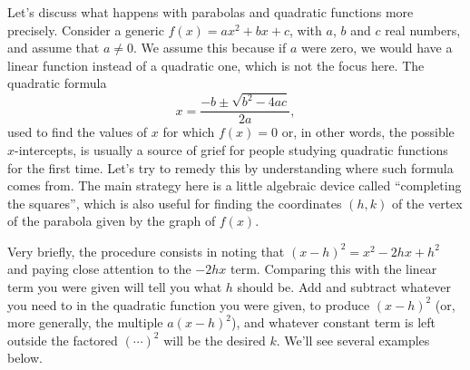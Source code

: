 \documentclass{ximera}
\begin{document}
Let's discuss what happens with parabolas and quadratic functions more precisely. Consider a generic $f(x) = ax^2+bx+c$, with $a$, $b$ and $c$ real numbers, and assume that $a \neq 0$. We assume this because if $a$ were zero, we would have a linear function instead of a quadratic one, which is not the focus here. The quadratic formula $$  x = \frac{-b \pm \sqrt{b^2-4ac}}{2a},$$used to find the values of $x$ for which $f(x) = 0$ or, in other words, the possible $x$-intercepts, is usually a source of grief for people studying quadratic functions for the first time. Let's try to remedy this by understanding where such formula comes from. The main strategy here is a little algebraic device called ``completing the squares'', which is also useful for finding the coordinates $(h,k)$ of the vertex of the parabola given by the graph of $f(x)$.

Very briefly, the procedure consists in noting that $(x-h)^2 = x^2-2hx+h^2$ and paying close attention to the $-2hx$ term. Comparing this with the linear term you were given will tell you what $h$ should be. Add and subtract whatever you need to in the quadratic function you were given, to produce $(x-h)^2$ (or, more generally, the multiple $a(x-h)^2$), and whatever constant term is left outside the factored $(\cdots)^2$ will be the desired $k$. We'll see several examples below.
\end{document}
